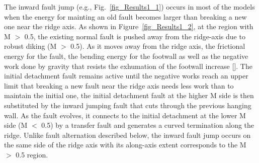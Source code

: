 The inward fault jump (e.g., Fig.~\hyperref[fig_Results1_1]{\ref{fig_Results1_1}}) occurs in most of the models when the energy for mainting an old fault becomes larger than breaking a new one near the ridge axis. As shown in Figure~\hyperref[fig_Results1_2]{\ref{fig_Results1_2}}, at the region with M $>$ 0.5, the existing normal fault is pushed away from the ridge-axis due to robust diking (M $>$ 0.5). As it moves away from the ridge axis, the frictional energy for the fault, the bending energy for the footwall as well as the negative work done by gravity that resists the exhumation of the footwall increase [\citealp{Lavier2000, Olive2014}]. The initial detachment fault remains active until the negative works reach an upper limit that breaking a new fault near the ridge axis needs less work than to maintain the initial one, the initial detachment fault at the higher M side is then substituted by the inward jumping fault that cuts through the previous hanging wall. As the fault evolves, it connects to the initial detachment at the lower M side (M $<$ 0.5) by a transfer fault and generates a curved termination along the ridge. Unlike fault alternation described below, the inward fault jump occurs on the same side of the ridge axis with its along-axis extent corresponds to the M $>$ 0.5 region.



